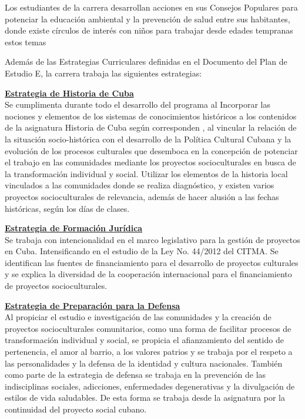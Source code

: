Los estudiantes de la carrera desarrollan acciones en sus Consejos Populares para potenciar la educación ambiental y la prevención de salud entre sus habitantes, donde existe círculos de interés con niños para trabajar desde edades tempranas estos temas

Además de las Estrategias Curriculares definidas en el Documento del Plan de Estudio E, la carrera trabaja las siguientes estrategias:

\underline{\textbf{Estrategia de Historia de Cuba}}\\
Se cumplimenta durante todo el desarrollo del programa al Incorporar las nociones y elementos de los sistemas de conocimientos históricos a los contenidos de la asignatura Historia de Cuba según corresponden , al vincular la relación de la situación socio-histórica con el desarrollo de la Política Cultural Cubana y la evolución de los procesos culturales que desemboca en la concepción de potenciar el trabajo en las comunidades mediante los proyectos socioculturales en busca de la transformación individual y social. Utilizar los elementos de la historia local vinculados a las comunidades donde se realiza diagnóstico, y existen varios proyectos socioculturales de relevancia, además de hacer alusión a las fechas históricas, según los días de clases. 

\underline{\textbf{Estrategia de Formación Jurídica}}\\
Se trabaja con intencionalidad en el marco legislativo para la gestión de proyectos en Cuba. Intensificando en el estudio de la Ley No. 44/2012 del CITMA. Se identifican las fuentes de financiamiento para el desarrollo de proyectos culturales y se explica la diversidad de la cooperación internacional para el financiamiento de proyectos socioculturales.

\underline{\textbf{Estrategia de Preparación para la Defensa}}\\
Al propiciar el estudio e investigación de las comunidades y la creación de proyectos socioculturales comunitarios, como una forma de facilitar procesos de transformación individual y social, se propicia el afianzamiento del sentido de pertenencia, el amor al barrio, a los valores patrios y se trabaja por el respeto a las personalidades y la defensa de la identidad y cultura nacionales. También como parte de la estrategia de defensa se trabaja en la prevención de las indisciplinas sociales, adicciones, enfermedades degenerativas y la divulgación de estilos de vida saludables. De esta forma se trabaja desde la asignatura por la continuidad del proyecto social cubano.

